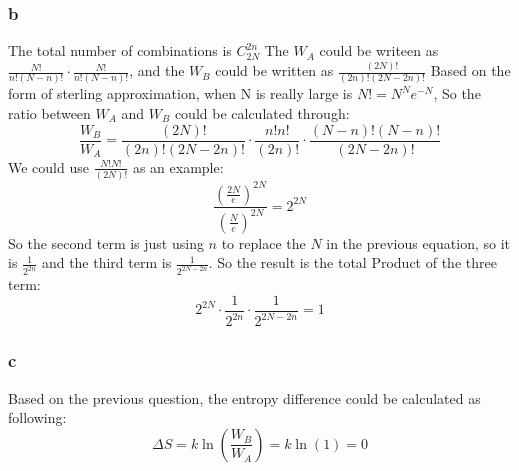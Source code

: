 \documentclass[a4paper]{article}
\begin{document}
\subsubsection{b}
The total number of combinations is $C_{2N}^{2n}$
The $W_{A}$ could be writeen as $\frac{N!}{n!(N-n)!}\cdot\frac{N!}{n!(N-n)!}$, and the $W_{B}$ could be written as $\frac{(2N)!}{(2n)!(2N-2n)!}$ Based on the form of sterling approximation, when N is really large is $N! = N^{N}e^{-N}$, So the ratio between $W_{A}$ and $W_{B}$ could be calculated through:
\begin{equation}
	\frac{W_{B}}{W_{A}}=\frac{(2N)!}{(2n)!(2N-2n)!}\cdot \frac{n! n!}{(2n)!}\cdot \frac{(N-n)!(N-n)!}{(2N-2n)!}
\end{equation}
We could use $\frac{N!N!}{(2N)!}$ as an example:
\begin{equation}
	\frac{(\frac{2N}{e})^{2N}}{(\frac{N}{e})^{2N}}=2^{2N}
\end{equation}
So the second term is just using $n$ to replace the $N$ in the previous equation, so it is $\frac{1}{2^{2n}}$ and the third term is $\frac{1}{2^{2N-2n}}$. 
\newline
So the result is the total Product of the three term:
\begin{equation}
	2^{2N} \cdot \frac{1}{2^{2n}} \cdot \frac{1}{2^{2N-2n}}=1
\end{equation}
\subsubsection{c}
Based on the previous question, the entropy difference could be calculated as following:
\begin{equation}
	\Delta S=k \ln (\frac{W_{B}}{W_{A}})=k \ln(1) =0
\end{equation}



\end{document}
